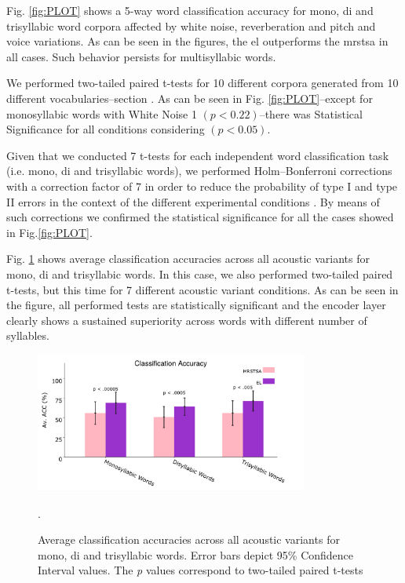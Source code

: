 {Fig. \ref{fig:PLOT}
shows a 5-way word classification accuracy for mono, di and trisyllabic word corpora affected by
white noise, reverberation and pitch and voice variations.
As can be seen in the figures, the \gls{el} outperforms the \gls{mrstsa} in all cases.
Such behavior persists for multisyllabic words.

We performed two-tailed paired t-tests for 10 different corpora generated from 10 different vocabularies--section . As can be seen in Fig. \ref{fig:PLOT}--except for monosyllabic words with White Noise 1 $(p < 0.22)$--there was Statistical Significance for all conditions considering $(p<0.05)$.

Given that we conducted 7 t-tests for each independent word classification task (i.e. mono, di and trisyllabic words), we performed Holm–Bonferroni corrections with a correction factor of 7 in order to reduce the probability of type I and type II errors in the context of the different experimental conditions \cite{10.1093/biomet/75.2.383}. By means of such corrections we confirmed the statistical significance for all the cases showed in Fig.\ref{fig:PLOT}.

Fig. \ref{fig:AV_ACC} shows average classification accuracies across all acoustic variants for mono, di and trisyllabic words.
In this case, we also performed two-tailed paired t-tests, but this time for 7 different acoustic variant conditions.
As can be seen in the figure, all performed tests are statistically significant and the encoder layer clearly shows
a sustained superiority across words with different number of syllables.

\begin{figure}[h!]
    \centering
    \includegraphics[width=0.8\textwidth]{PLOT1.png}
    \caption{Average classification accuracies across all acoustic variants for mono, di and trisyllabic words. Error bars depict 95\% Confidence Interval values. The \emph{p} values correspond to two-tailed paired t-tests}.
    \label{fig:AV_ACC}
\end{figure}
}

















